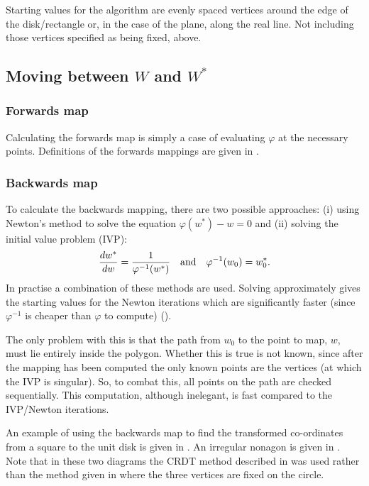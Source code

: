 Starting values for the algorithm are evenly spaced vertices around the edge of the disk/rectangle or, in the case of the plane, along the real line. Not including those vertices specified as being fixed, above.

\subsection{Moving between $W$ and $W^*$}

\subsubsection{Forwards map}

Calculating the forwards map is simply a case of evaluating $\varphi$ at the necessary points. Definitions of the forwards mappings are given in .

\subsubsection{Backwards map}

To calculate the backwards mapping, there are two possible approaches: (i) using Newton's method to solve the equation $\varphi(w^*)-w=0$ and (ii) solving the initial value problem (IVP):
\begin{equation}
\label{scivp}
\frac{dw^*}{dw}=\frac{1}{\varphi^{-1}(w^*)} \quad \text{and} \quad \varphi^{-1}(w_0)=w^*_0.
\end{equation}
In practise a combination of these methods are used. Solving  approximately gives the starting values for the Newton iterations which are significantly faster (since $\varphi^{-1}$ is cheaper than $\varphi$ to compute) (\cite[p. 29]{driscoll}).

The only problem with this is that the path from $w_0$ to the point to map, $w$, must lie entirely inside the polygon. Whether this is true is not known, since after the mapping has been computed the only known points are the vertices (at which the IVP is singular). So, to combat this, all points on the path are checked sequentially. This computation, although inelegant, is fast compared to the IVP/Newton iterations.

An example of using the backwards map to find the transformed co-ordinates from a square to the unit disk is given in . An irregular nonagon is given in . Note that in these two diagrams the CRDT method described in  was used rather than the method given in  where the three vertices are fixed on the circle.


